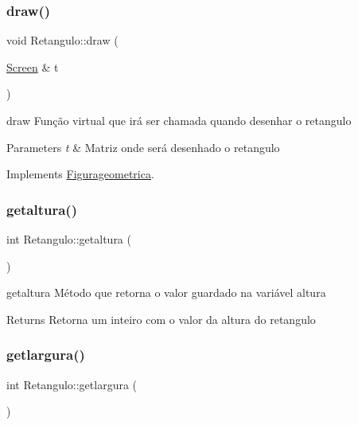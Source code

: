 \subsubsection{\texorpdfstring{draw()}{draw()}}
{\footnotesize\ttfamily void Retangulo\+::draw (\begin{DoxyParamCaption}\item[{\mbox{\hyperlink{class_screen}{Screen}} \&}]{t }\end{DoxyParamCaption})\hspace{0.3cm}{\ttfamily [virtual]}}



draw Função virtual que irá ser chamada quando desenhar o retangulo 


\begin{DoxyParams}{Parameters}
{\em t} & Matriz onde será desenhado o retangulo \\
\hline
\end{DoxyParams}


Implements \mbox{\hyperlink{class_figurageometrica_a68d9aba508879bb7a9ea1fe9d1d4f5f4}{Figurageometrica}}.

\mbox{\label{class_retangulo_a42d313847d429dda0869873a7b0e47a1}} 
\subsubsection{\texorpdfstring{getaltura()}{getaltura()}}
{\footnotesize\ttfamily int Retangulo\+::getaltura (\begin{DoxyParamCaption}{ }\end{DoxyParamCaption})}



getaltura Método que retorna o valor guardado na variável altura 

\begin{DoxyReturn}{Returns}
Retorna um inteiro com o valor da altura do retangulo 
\end{DoxyReturn}
\mbox{\label{class_retangulo_a44414c2c20da988fec6ec12722ae95dc}} 
\subsubsection{\texorpdfstring{getlargura()}{getlargura()}}
{\footnotesize\ttfamily int Retangulo\+::getlargura (\begin{DoxyParamCaption}{ }\end{DoxyParamCaption})}



